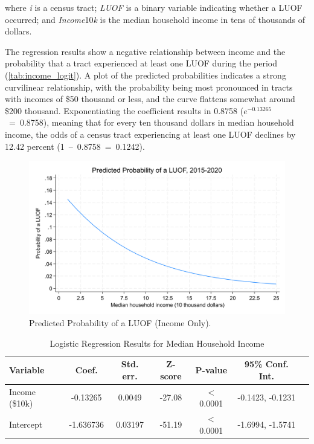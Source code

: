 \documentclass[12pt]{article}
\begin{document}
\noindent{}where \textit{i} is a census tract; \textit{LUOF} is a binary variable indicating whether a LUOF occurred; and \textit{Income}10\textit{k} is the median household income in tens of thousands of dollars.

The regression results show a negative relationship between income and the probability that a tract experienced at least one LUOF during the period (\autoref{tab:income_logit}). A plot of the predicted probabilities indicates a strong curvilinear relationship, with the probability being most pronounced in tracts with incomes of \$50 thousand or less, and the curve flattens somewhat around \$200 thousand. Exponentiating the coefficient results in 0.8758 ($e^{-0.13265}$~=~0.8758), meaning that for every ten thousand dollars in median household income, the odds of a census tract experiencing at least one LUOF declines by 12.42 percent (1~--~0.8758~=~0.1242).

\begin{figure}[H]
  \centering %
  \includegraphics[width=\linewidth]{images/LUOF_logit_income_only}
  \captionsetup{justification=centering, singlelinecheck=false, margin=2cm}
  \caption[Predicted Probability of a LUOF (Income Only)]{Predicted Probability of a LUOF (Income Only).}
  \label{fig:logit_income_plot}
\end{figure}

\begin{table}[ht]
\centering
\begin{tabular}{lcccccc}
\toprule
\textbf{Variable} & \textbf{Coef.} & \textbf{Std. err.} & \textbf{Z-score} & \textbf{P-value} & \textbf{95\% Conf. Int.} \\
\midrule
Income (\$10k) & -0.13265 & 0.0049 & -27.08 & $<$0.0001 & -0.1423, -0.1231 \\
Intercept & -1.636736 & 0.03197 & -51.19 & $<$0.0001 & -1.6994, -1.5741 \\
\bottomrule
\end{tabular}
\caption{Logistic Regression Results for Median Household Income}
\label{tab:income_logit}
\end{table}
\end{document}
